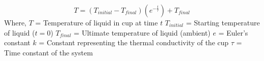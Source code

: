 \documentclass[aspectratio=169,xcolor=dvipsnames]{beamer}
\begin{document}
%
%
%
\begin{frame}
	\frametitle{}

%
	$$T = \left( T_{initial} - T_{final} \right) \left( e^{-{\frac {t}{\tau}}} \right) + T_{final}$$
\vskip 5pt 
Where,
\vskip 5pt 
$T$ = Temperature of liquid in cup at time $t$
\vskip 5pt 
$T_{initial}$ = Starting temperature of liquid ($t = 0$)
\vskip 5pt 
$T_{final}$ = Ultimate temperature of liquid (ambient)
\vskip 5pt 
$e$ = Euler's constant 
\vskip 5pt 
$k$ = Constant representing the thermal conductivity of the cup
\vskip 5pt 
$\tau$ = Time constant of the system
\end{frame}
%
%
%
%
\end{document}
